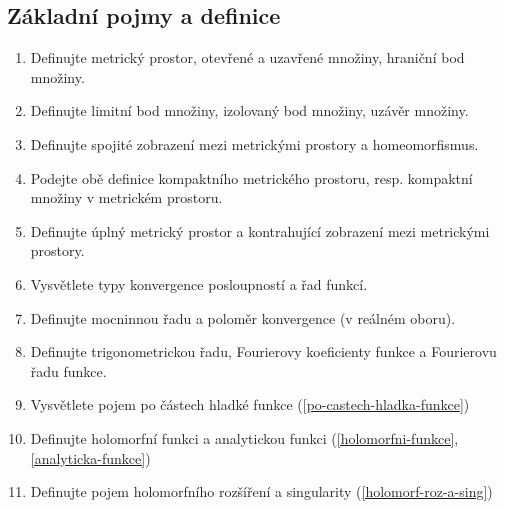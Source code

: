\documentclass[a4paper,10pt]{article}
\begin{document}
\subsection{Základní pojmy a definice}
\setcounter{equation}{0}

\begin{enumerate}
\item Definujte metrický prostor, otevřené a uzavřené množiny, 
hraniční bod množiny.
\item Definujte limitní bod množiny, izolovaný bod množiny, uzávěr množiny. 
\item Definujte spojité zobrazení mezi metrickými prostory a homeomorfismus. 
\item Podejte obě definice kompaktního metrického prostoru, resp. kompaktní
množiny v metrickém prostoru.
\item Definujte úplný metrický prostor a kontrahující zobrazení mezi metrickými 
prostory.
\item Vysvětlete typy konvergence posloupností a řad funkcí.
\item Definujte mocninnou řadu a poloměr konvergence (v reálném oboru). 
\item Definujte trigonometrickou řadu, Fourierovy koeficienty funkce a Fourierovu 
řadu funkce. 
\item Vysvětlete pojem po částech hladké funkce (\ref{po-castech-hladka-funkce})
\item Definujte holomorfní funkci a analytickou funkci (\ref{holomorfni-funkce},
\ref{analyticka-funkce})
\item Definujte pojem holomorfního rozšíření a singularity
(\ref{holomorf-roz-a-sing})
\end{enumerate}
\end{document}
